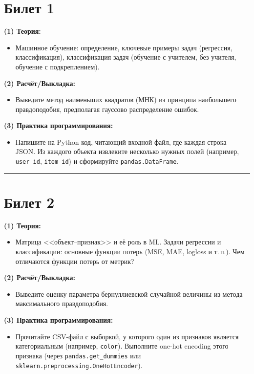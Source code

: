 \documentclass[a4paper,12pt]{article}
\begin{document}
\raggedright

\section*{Билет 1}
\textbf{(1) Теория:}
\begin{itemize}
  \item Машинное обучение: определение, ключевые примеры задач (регрессия, классификация), классификация задач (обучение с учителем, без учителя, обучение с подкреплением).
\end{itemize}

\textbf{(2) Расчёт/Выкладка:}
\begin{itemize}
  \item Выведите метод наименьших квадратов (МНК) из принципа наибольшего правдоподобия, предполагая гауссово распределение ошибок.
\end{itemize}

\textbf{(3) Практика программирования:}
\begin{itemize}
  \item Напишите на Python код, читающий входной файл, где каждая строка --- JSON. Из каждого объекта извлеките несколько нужных полей (например, \texttt{user\_id}, \texttt{item\_id}) и сформируйте \texttt{pandas.DataFrame}.
\end{itemize}

\noindent\rule{\textwidth}{0.4pt}
\newpage

\section*{Билет 2}
\textbf{(1) Теория:}
\begin{itemize}
  \item Матрица <<объект--признак>> и её роль в ML. Задачи регрессии и классификации: основные функции потерь (MSE, MAE, logloss и т.\,п.). Чем отличаются функции потерь от метрик?
\end{itemize}

\textbf{(2) Расчёт/Выкладка:}
\begin{itemize}
  \item Выведите оценку параметра бернуллиевской случайной величины из метода максимального правдоподобия.
\end{itemize}

\textbf{(3) Практика программирования:}
\begin{itemize}
  \item Прочитайте CSV-файл с выборкой, у которого один из признаков является категориальным (например, \texttt{color}). Выполните one-hot encoding этого признака (через \texttt{pandas.get\_dummies} или \texttt{sklearn.preprocessing.OneHotEncoder}).
\end{itemize}
\end{document}
